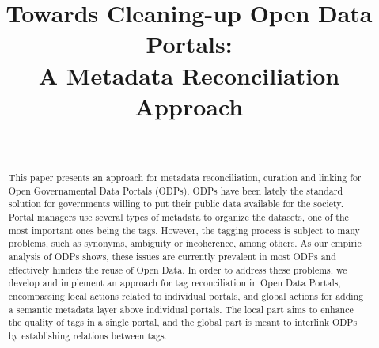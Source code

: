 \documentclass[conference]{IEEEtran}
\begin{document}
%

\title{Towards Cleaning-up Open Data Portals: \\ A Metadata Reconciliation Approach}


%
\author{
\\
}


\maketitle
\IEEEpeerreviewmaketitle

\begin{abstract}

This paper presents an approach for metadata reconciliation, curation and linking for Open Governamental Data Portals (ODPs).
ODPs have been lately the standard solution for governments willing to put their public data available for the society.
Portal managers use several types of metadata to organize the datasets, one of the most important ones being the tags.
However, the tagging process is subject to many problems, such as synonyms, ambiguity or incoherence, among others.
As our empiric analysis of ODPs shows, these issues are currently prevalent in most ODPs and effectively hinders the reuse of Open Data.
In order to address these problems, we develop and implement an approach for tag reconciliation in Open Data Portals, encompassing local actions related to individual portals, and global actions for adding a semantic metadata layer above individual portals.
The local part aims to enhance the quality of tags in a single portal, and the global part is meant to interlink ODPs by establishing relations between tags.

\end{abstract}
\end{document}
